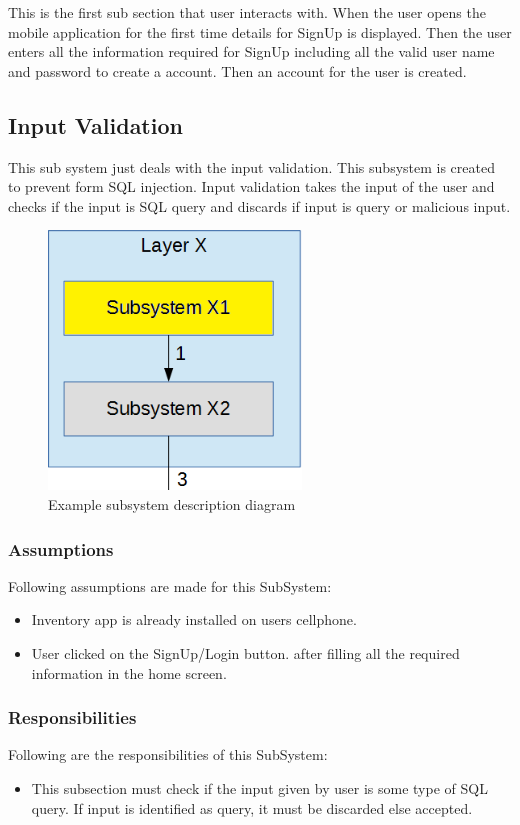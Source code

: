 This is the first sub section that user interacts with. When the user opens the mobile application for the first time details for SignUp is displayed. Then the user enters all the information required for SignUp including all the valid user name and password to create a account. Then an account for the user is created.

\subsection{Input Validation}
This sub system just deals with the input validation. This subsystem is created to prevent form SQL injection. Input validation takes the input of the user and checks if the input is SQL query and discards if input is query or malicious input.

\begin{figure}[h!]
	\centering
 	\includegraphics[width=0.60\textwidth]{images/subsystem}
 \caption{Example subsystem description diagram}
\end{figure}

\subsubsection{Assumptions}
Following assumptions are made for this SubSystem:
\begin{itemize}
    \item Inventory app is already installed on users cellphone.
    \item User clicked on the SignUp/Login button. after filling all the required information in the home screen.
\end{itemize}

\subsubsection{Responsibilities}
Following are the responsibilities of this SubSystem:
\begin{itemize}
    \item This subsection must check if the input given by user is some type of SQL query. If input is identified as query, it must be discarded else accepted.
\end{itemize}

